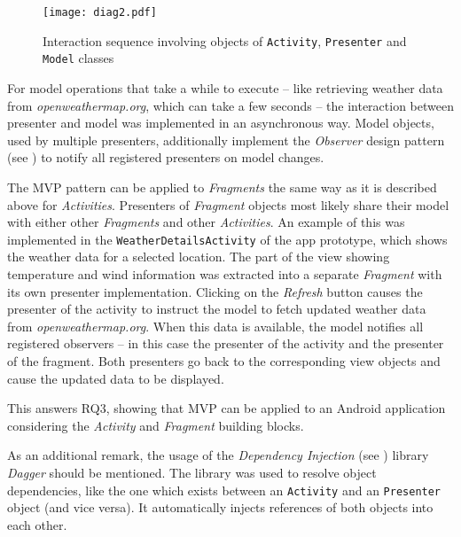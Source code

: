 \begin{figure}[h]
\centering
\texttt{[image: diag2.pdf]}
\caption{Interaction sequence involving objects of \texttt{Activity}, \texttt{Presenter} and \texttt{Model} classes}
\label{fig:androidmvpseq}
\end{figure}

For model operations that take a while to execute -- like retrieving weather data from \emph{openweathermap.org}, which can take a few seconds -- the interaction between presenter and model was implemented in an asynchronous way. Model objects, used by multiple presenters, additionally implement the \emph{Observer} design pattern (see \cite[p. 287]{GangOfFour}) to notify all registered presenters on model changes.

The MVP pattern can be applied to \emph{Fragments} the same way as it is described above for \emph{Activities}. Presenters of \emph{Fragment} objects most likely share their model with either other \emph{Fragments} and other \emph{Activities}. An example of this was implemented in the \texttt{WeatherDetailsActivity} of the app prototype, which shows the weather data for a selected location. The part of the view showing temperature and wind information was extracted into a separate \emph{Fragment} with its own presenter implementation. Clicking on the \emph{Refresh} button causes the presenter of the activity to instruct the model to fetch updated weather data from \emph{openweathermap.org}. When this data is available, the model notifies all registered observers -- in this case the presenter of the activity and the presenter of the fragment. Both presenters go back to the corresponding view objects and cause the updated data to be displayed.


This answers RQ3, showing that MVP can be applied to an Android application considering the \emph{Activity} and \emph{Fragment} building blocks.

As an additional remark, the usage of the \emph{Dependency Injection} (see \cite{FowlerIoC}) library \emph{Dagger} should be mentioned. The library was used to resolve object dependencies, like the one which exists between an \texttt{Activity} and an \texttt{Presenter} object (and vice versa). It automatically injects references of both objects into each other.
